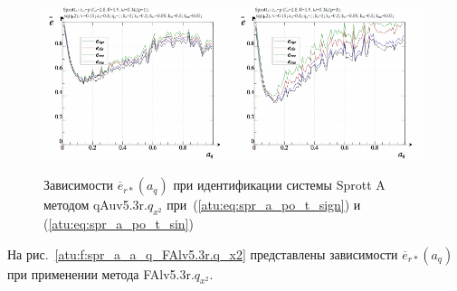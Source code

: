 \begin{figure}[h!]
  \centerline{
    \includegraphics[width=0.49\textwidth]{p/cha/spr_a/qAuv5.3r/sprott_a_qAuv5_3r_qx2-p_a_q_e_sign.png}
    \hfill
    \includegraphics[width=0.49\textwidth]{p/cha/spr_a/qAuv5.3r/sprott_a_qAuv5_3r_qx2-p_a_q_e_sin.png}
  }
  \caption{Зависимости $\overline{e}_{r*}(a_q)$ при идентификации системы Sprott A методом qAuv5.3r.$q_{x^2}$
   при~(\ref{atu:eq:spr_a_po_t_sign}) и (\ref{atu:eq:spr_a_po_t_sin})}
  \label{atu:f:spr_a_a_q_qAuv5.3r.q_x2}
\end{figure}


На рис.~\ref{atu:f:spr_a_a_q_FAlv5.3r.q_x2} представлены зависимости
$\overline{e}_{r*}(a_q)$ при применении метода FAlv5.3r.$q_{x^2}$.

